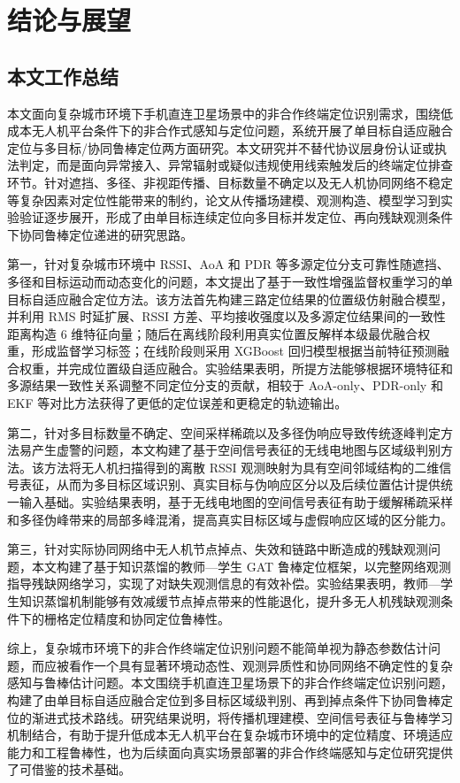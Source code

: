 \chapter{结论与展望}
\label{ch:conclusion}

\section{本文工作总结}
\label{sec:5_1}

本文面向复杂城市环境下手机直连卫星场景中的非合作终端定位识别需求，围绕低成本无人机平台条件下的非合作式感知与定位问题，系统开展了单目标自适应融合定位与多目标/协同鲁棒定位两方面研究。本文研究并不替代协议层身份认证或执法判定，而是面向异常接入、异常辐射或疑似违规使用线索触发后的终端定位排查环节。针对遮挡、多径、非视距传播、目标数量不确定以及无人机协同网络不稳定等复杂因素对定位性能带来的制约，论文从传播场建模、观测构造、模型学习到实验验证逐步展开，形成了由单目标连续定位向多目标并发定位、再向残缺观测条件下协同鲁棒定位递进的研究思路。

第一，针对复杂城市环境中 RSSI、AoA 和 PDR 等多源定位分支可靠性随遮挡、多径和目标运动而动态变化的问题，本文提出了基于一致性增强监督权重学习的单目标自适应融合定位方法。该方法首先构建三路定位结果的位置级仿射融合模型，并利用 RMS 时延扩展、RSSI 方差、平均接收强度以及多源定位结果间的一致性距离构造 6 维特征向量；随后在离线阶段利用真实位置反解样本级最优融合权重，形成监督学习标签；在线阶段则采用 XGBoost 回归模型根据当前特征预测融合权重，并完成位置级自适应融合。实验结果表明，所提方法能够根据环境特征和多源结果一致性关系调整不同定位分支的贡献，相较于 AoA-only、PDR-only 和 EKF 等对比方法获得了更低的定位误差和更稳定的轨迹输出。

第二，针对多目标数量不确定、空间采样稀疏以及多径伪响应导致传统逐峰判定方法易产生虚警的问题，本文构建了基于空间信号表征的无线电地图与区域级判别方法。该方法将无人机扫描得到的离散 RSSI 观测映射为具有空间邻域结构的二维信号表征，从而为多目标区域识别、真实目标与伪响应区分以及后续位置估计提供统一输入基础。实验结果表明，基于无线电地图的空间信号表征有助于缓解稀疏采样和多径伪峰带来的局部多峰混淆，提高真实目标区域与虚假响应区域的区分能力。

第三，针对实际协同网络中无人机节点掉点、失效和链路中断造成的残缺观测问题，本文构建了基于知识蒸馏的教师—学生 GAT 鲁棒定位框架，以完整网络观测指导残缺网络学习，实现了对缺失观测信息的有效补偿。实验结果表明，教师—学生知识蒸馏机制能够有效减缓节点掉点带来的性能退化，提升多无人机残缺观测条件下的栅格定位精度和协同定位鲁棒性。

综上，复杂城市环境下的非合作终端定位识别问题不能简单视为静态参数估计问题，而应被看作一个具有显著环境动态性、观测异质性和协同网络不确定性的复杂感知与鲁棒估计问题。本文围绕手机直连卫星场景下的非合作终端定位识别问题，构建了由单目标自适应融合定位到多目标区域级判别、再到掉点条件下协同鲁棒定位的渐进式技术路线。研究结果说明，将传播机理建模、空间信号表征与鲁棒学习机制结合，有助于提升低成本无人机平台在复杂城市环境中的定位精度、环境适应能力和工程鲁棒性，也为后续面向真实场景部署的非合作终端感知与定位研究提供了可借鉴的技术基础。

